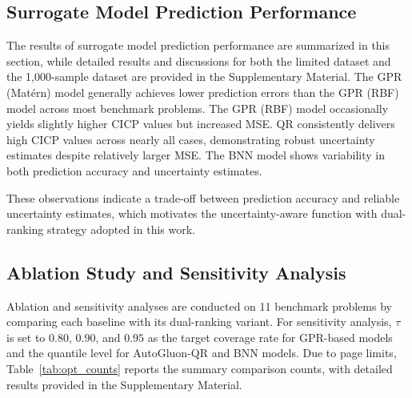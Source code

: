 \documentclass{article}
\begin{document}
\subsection{Surrogate Model Prediction Performance}
The results of surrogate model prediction performance are summarized in this section, while detailed results and discussions for both the limited dataset and the 1,000-sample dataset are provided in the Supplementary Material. The GPR (Mat\'ern) model generally achieves lower prediction errors than the GPR (RBF) model across most benchmark problems. The GPR (RBF) model occasionally yields slightly higher CICP values but increased MSE. QR consistently delivers high CICP values across nearly all cases, demonstrating robust uncertainty estimates despite relatively larger MSE. The BNN model shows variability in both prediction accuracy and uncertainty estimates. 

These observations indicate a trade-off between prediction accuracy and reliable uncertainty estimates, which motivates the uncertainty-aware function with dual-ranking strategy adopted in this work.

\subsection{Ablation Study and Sensitivity Analysis}
Ablation and sensitivity analyses are conducted on 11 benchmark problems by comparing each baseline with its dual-ranking variant. For sensitivity analysis, $\tau$ is set to $0.80$, $0.90$, and $0.95$ as the target coverage rate for GPR-based models and the quantile level for AutoGluon-QR and BNN models. Due to page limits, Table~\ref{tab:opt_counts} reports the summary comparison counts, with detailed results provided in the Supplementary Material.
\end{document}
